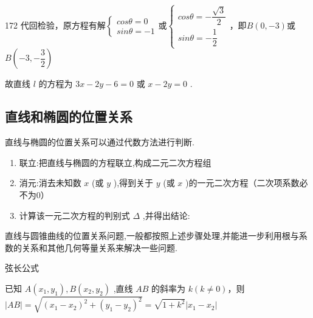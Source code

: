 \begin{enumerate}
\begin{jieda}
\begin{enumerate}
\begin{dingautolist}{172}
                    代回检验，原方程有解$\left\{\begin{array}{l}
                        cos\theta = 0 \\
                        sin\theta = -1
                    \end{array}\right.$或$\left\{\begin{array}{l}
                        cos\theta = -\dfrac{\sqrt{3}}{2} \\
                        sin\theta = -\dfrac{1}{2}
                    \end{array}\right.$，即$B\left( {0, - 3}\right)$或 $B\left( {-3, - \dfrac{3}{2}}\right)$

                    故直线 $l$ 的方程为 ${3x} - {2y} - 6 = 0$ 或 $x - {2y} = 0$ .
                \end{dingautolist}
            \end{enumerate}
        \end{jieda}
\end{enumerate}
\subsection*{直线和椭圆的位置关系}
直线与椭圆的位置关系可以通过代数方法进行判断.
\begin{enumerate}
    \item 联立:把直线与椭圆的方程联立,构成二元二次方程组
    \item 消元:消去未知数 $x$ (或 $y$ ),得到关于 $y$ (或 $x$ )的一元二次方程（二次项系数必不为0）
    \item 计算该一元二次方程的判别式 $\Delta$ ,并得出结论:
\end{enumerate}
直线与圆锥曲线的位置关系问题,一般都按照上述步骤处理,并能进一步利用根与系数的关系和其他几何等量关系来解决一些问题. 

弦长公式

已知 $A\left( {{x}_{1},{y}_{1}}\right) ,B\left( {{x}_{2},{y}_{2}}\right)$ ,直线 ${AB}$ 的斜率为 $k\left( {k \neq  0}\right)$，则 $\left| {AB}\right|  = \sqrt{{\left( {x}_{1} - {x}_{2}\right) }^{2} + {\left( {y}_{1} - {y}_{2}\right) }^{2}} = \sqrt{1 + {k}^{2}}\left| {{x}_{1} - {x}_{2}}\right|$

